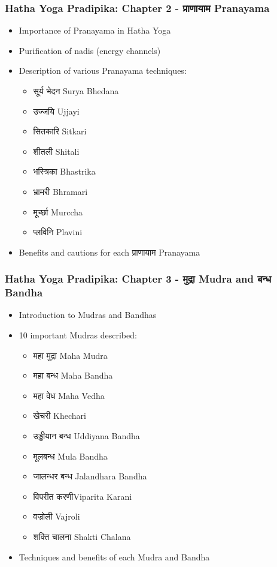 \begin{frame}[fragile]\frametitle{Hatha Yoga Pradipika: Chapter 2 - प्राणायाम  Pranayama}
\begin{itemize}
    \item Importance of Pranayama in Hatha Yoga
    \item Purification of nadis (energy channels)
    \item Description of various Pranayama techniques:
    \begin{itemize}
        \item सूर्य भेदन Surya Bhedana
        \item उज्जयि Ujjayi
        \item सितकारि Sitkari
        \item शीतली Shitali
        \item भस्त्रिका Bhastrika
        \item भ्रामरी Bhramari
        \item मूर्च्छा Murccha
        \item प्लविनि Plavini
    \end{itemize}
    \item Benefits and cautions for each प्राणायाम Pranayama
\end{itemize}
\end{frame}

\begin{frame}[fragile]\frametitle{Hatha Yoga Pradipika: Chapter 3 - मुद्रा  Mudra and बन्ध Bandha}
\begin{itemize}
    \item Introduction to Mudras and Bandhas
    \item 10 important Mudras described:
    \begin{itemize}
        \item महा मुद्रा Maha Mudra
        \item महा बन्ध Maha Bandha
        \item महा  वेध  Maha Vedha
        \item खेचरी Khechari
        \item उड्डीयान बन्ध Uddiyana Bandha
        \item मूलबन्ध Mula Bandha
        \item जालन्धर बन्ध Jalandhara Bandha
        \item विपरीत करणीViparita Karani
        \item वज्रोली Vajroli
        \item शक्ति चालना Shakti Chalana
    \end{itemize}
    \item Techniques and benefits of each Mudra and Bandha
\end{itemize}
\end{frame}

